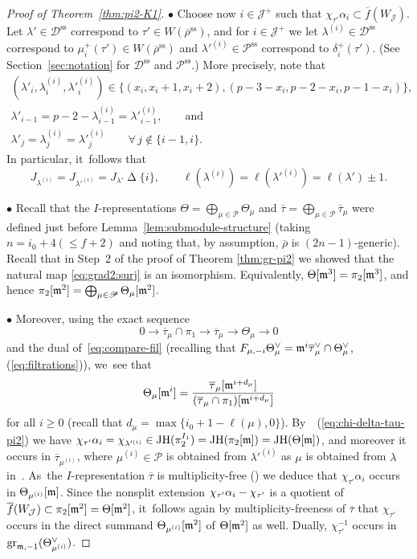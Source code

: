 \documentclass[JEP,XML,SOM,Unicode,NoFloatCountersInSection, NoEqCountersInSection,published]{cedram}
\newcommand{\sbullet}{{\scriptscriptstyle\bullet}}
\let\ovl\overline
\newcommand{\cJ}{{\mathcal{J}}}
\newcommand{\D}{\mathscr D}
\renewcommand{\P}{\mathscr P}
\renewcommand{\ss}{\mathrm{ss}}
\newcommand{\brho}{\overline{\rho}}
\DeclareMathOperator{\gr}{gr}
\DeclareMathOperator{\JH}{\mathrm{JH}}
\theoremstyle{plain}
\theoremstyle{definition}
\begin{document}
\begin{proof}[Proof of Theorem~\ref{thm:pi2-K1}]
$\sbullet$ Choose now $i \in \cJ^+$ such that $\chi_{\tau'} \alpha_i \subset \ovl f(W_\cJ)$.
Let $\lambda' \in \D^\ss$ correspond to $\tau' \in W(\brho^\ss)$, and for $i \in \cJ^+$ we let $\lambda^{(i)} \!\in\! \D^\ss$ correspond to $\mu_i^+(\tau') \!\in\! W(\brho^\ss)$ and $\lambda'^{(i)} \!\in\! \P^\ss$ correspond to $\delta_i^+(\tau')$.
(See Section~\ref{sec:notation} for $\D^\ss$ and $\P^\ss$.)
More precisely, note that
\begin{gather*}
(\lambda'_{i},\lambda^{(i)}_{i},\lambda'^{(i)}_{i}) \in \bigl\{ (x_{i},x_{i}+1,x_{i}+2), (p-3-x_{i},p-2-x_{i},p-1-x_{i}) \bigr\},\\
\lambda'_{i-1} = p-2-\lambda^{(i)}_{i-1} = \lambda'^{(i)}_{i-1}, \qquad \text{and}\\
\lambda'_j = \lambda^{(i)}_j = \lambda'^{(i)}_j \qquad \forall\,j \notin \{i-1,i\}.
\end{gather*}
In particular, it~follows that
\begin{equation}\label{eq:lengths-lambda}
J_{\lambda^{(i)}} = J_{\lambda'^{(i)}} = J_{\lambda'}\mathbin\Delta \{i\}, \qquad \ell(\lambda^{(i)}) = \ell(\lambda'^{(i)}) = \ell(\lambda')\pm 1.
\end{equation}

$\sbullet$ Recall that the $I$-representations $\Theta = \bigoplus_{\mu \in \P} \Theta_\mu$ and $\ovl\tau = \bigoplus_{\mu \in \P} \ovl\tau_\mu$ were defined just before Lemma~\ref{lem:submodule-structure} (taking $n = i_0+4 {(\le f+2)}$ and {noting that, by assumption, $\brho$ is $(2n-1)$-generic}).
Recall that in Step~2 of the proof of Theorem \ref{thm:gr-pi2} we showed that the natural map \eqref{eq:grad2:surj} is an isomorphism. Equivalently, $\Theta[\mathfrak{m}^3] = \pi_2[\mathfrak{m}^3]$, and hence $\pi_2[\m^2] = \bigoplus_{\mu \in \P} \Theta_\mu[\m^2]$.

$\sbullet$ Moreover, using the exact sequence
\[
0 \to \ovl\tau_\mu \cap \pi_1 \to \ovl\tau_\mu \to \Theta_\mu\to 0
\]
and the dual of~\eqref{eq:compare-fil} (recalling that $F_{\mu,-i} \Theta_\mu^\vee = \m^i \ovl\tau_\mu^\vee \cap \Theta_\mu^\vee$, \cf (\ref{eq:filtrations})), we~see that
\begin{equation*}
\Theta_\mu[\m^i] = \frac{\ovl\tau_\mu[\m^{i+d_\mu}]}{(\ovl\tau_\mu \cap \pi_1)[\m^{i+d_\mu}]}
\end{equation*}
for all $i\geq 0$ (recall that $d_\mu = \max\{i_0+1-\ell(\mu),0\}$). By~~(\ref{eq:chi-delta-tau-pi2}) we have $\chi_{\tau'} \alpha_i = \chi_{\lambda'^{(i)}} \in \JH(\pi_2^{I_1}) = \JH(\pi_2[\m]) = \JH(\Theta[\m])$, and moreover it occurs in $\ovl\tau_{\mu^{(i)}}$, where $\mu^{(i)} \in \P$ is obtained from $\lambda'^{(i)}$ as $\mu$ is obtained from $\lambda$ in~\cite[Eq.\,(61)]{BHHMS4}. As~the $I$-representation $\ovl\tau$ is multiplicity-free (\cite[Cor.\,2.4.3(ii)]{BHHMS4}) we deduce that $\chi_{\tau'} \alpha_i$ occurs in $\Theta_{\mu^{(i)}}[\mathfrak{m}]$.
Since the nonsplit extension $\chi_{\tau'}\alpha_i \-- \chi_{\tau'}$ is a quotient of $\ovl f(W_\cJ) \subset \pi_2[\m^2] = \Theta[\m^2]$, it~follows again by multiplicity-freeness of $\ovl\tau$ that $\chi_{\tau'}$ occurs in the direct summand $\Theta_{\mu^{(i)}}[\mathfrak{m}^2]$ of $\Theta[\mathfrak{m}^2]$ as well.
Dually, $\chi_{\tau'}^{-1}$ occurs in $\gr_{\m,-1}(\Theta_{\mu^{(i)}}^\vee)$.


\end{proof}
\end{document}
